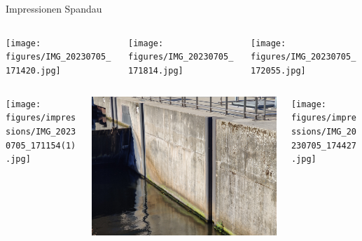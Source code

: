 \documentclass[light]{lutbeamer} %
\begin{document}
\begin{frame}{Impressionen Spandau}
\vspace{0.5cm}
    \begin{columns}
        \begin{column}{0.3\textwidth}
            \texttt{[image: figures/IMG\_20230705\_171420.jpg]}
        \end{column}
        \begin{column}{0.3\textwidth}
            \texttt{[image: figures/IMG\_20230705\_171814.jpg]}
        \end{column}
        \begin{column}{0.3\textwidth}
            \texttt{[image: figures/IMG\_20230705\_172055.jpg]}
        \end{column}
    \end{columns}
    \vspace{0.5cm}
        \begin{columns}
    \begin{column}{0.3\textwidth}
            \texttt{[image: figures/impressions/IMG\_20230705\_171154(1).jpg]}
        \end{column}
        \begin{column}{0.3\textwidth}
            \includegraphics[width=\textwidth]{figures/impressions/IMG_20230705_173445(1).jpg}
        \end{column}
        \begin{column}{0.3\textwidth}
            \texttt{[image: figures/impressions/IMG\_20230705\_174427.jpg]}
        \end{column}
    \end{columns}
\end{frame}
\end{document}

